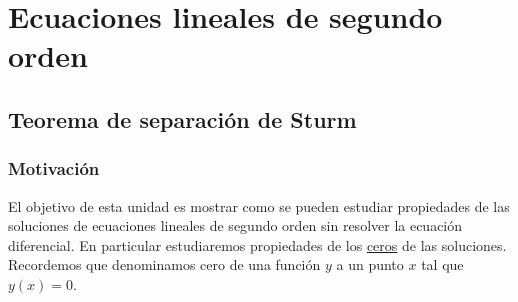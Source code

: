 
% 
% 

%


\chapter{Ecuaciones lineales de segundo orden}


\section{Teorema de separación de Sturm}
\subsection{Motivación}


El objetivo  de esta unidad es mostrar como se pueden estudiar propiedades de las soluciones de ecuaciones lineales de segundo orden sin resolver la ecuación diferencial. En particular estudiaremos propiedades de  los \href{http://es.wikipedia.org/wiki/Raíz_de_una_función}{ceros} de las soluciones. Recordemos que denominamos cero de una función $y$ a un punto $x$ tal que $y(x)=0$.

